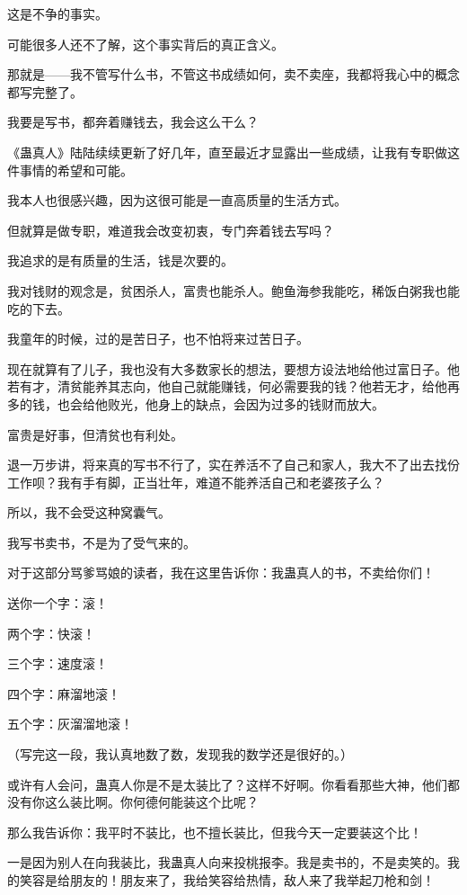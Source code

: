\begin{this_body}
这是不争的事实。

可能很多人还不了解，这个事实背后的真正含义。

那就是——我不管写什么书，不管这书成绩如何，卖不卖座，我都将我心中的概念都写完整了。

我要是写书，都奔着赚钱去，我会这么干么？

《蛊真人》陆陆续续更新了好几年，直至最近才显露出一些成绩，让我有专职做这件事情的希望和可能。

我本人也很感兴趣，因为这很可能是一直高质量的生活方式。

但就算是做专职，难道我会改变初衷，专门奔着钱去写吗？

我追求的是有质量的生活，钱是次要的。

我对钱财的观念是，贫困杀人，富贵也能杀人。鲍鱼海参我能吃，稀饭白粥我也能吃的下去。

我童年的时候，过的是苦日子，也不怕将来过苦日子。

现在就算有了儿子，我也没有大多数家长的想法，要想方设法地给他过富日子。他若有才，清贫能养其志向，他自己就能赚钱，何必需要我的钱？他若无才，给他再多的钱，也会给他败光，他身上的缺点，会因为过多的钱财而放大。

富贵是好事，但清贫也有利处。

退一万步讲，将来真的写书不行了，实在养活不了自己和家人，我大不了出去找份工作呗？我有手有脚，正当壮年，难道不能养活自己和老婆孩子么？

所以，我不会受这种窝囊气。

我写书卖书，不是为了受气来的。

对于这部分骂爹骂娘的读者，我在这里告诉你：我蛊真人的书，不卖给你们！

送你一个字：滚！

两个字：快滚！

三个字：速度滚！

四个字：麻溜地滚！

五个字：灰溜溜地滚！

（写完这一段，我认真地数了数，发现我的数学还是很好的。）

或许有人会问，蛊真人你是不是太装比了？这样不好啊。你看看那些大神，他们都没有你这么装比啊。你何德何能装这个比呢？

那么我告诉你：我平时不装比，也不擅长装比，但我今天一定要装这个比！

一是因为别人在向我装比，我蛊真人向来投桃报李。我是卖书的，不是卖笑的。我的笑容是给朋友的！朋友来了，我给笑容给热情，敌人来了我举起刀枪和剑！


\end{this_body}
